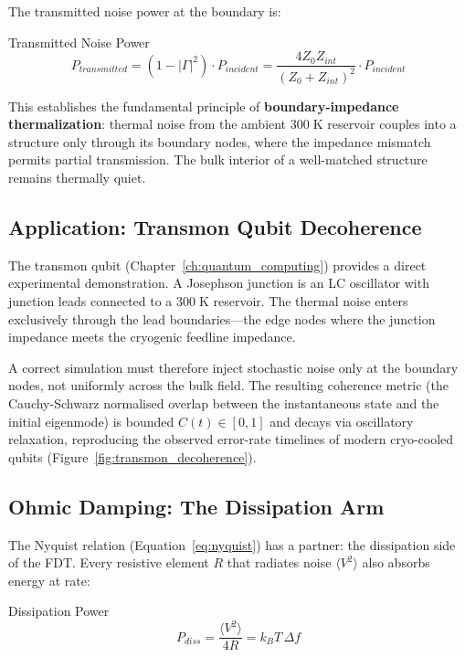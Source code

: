 The transmitted noise power at the boundary is:
\begin{resultbox}{Transmitted Noise Power}
\begin{equation}
    P_{transmitted} = (1 - |\Gamma|^2) \cdot P_{incident} = \frac{4 Z_0 Z_{int}}{(Z_0 + Z_{int})^2} \cdot P_{incident}
    \label{eq:transmitted_power}
\end{equation}
\end{resultbox}

This establishes the fundamental principle of \textbf{boundary-impedance thermalization}: thermal noise from the ambient $300\;\text{K}$ reservoir couples into a structure only through its boundary nodes, where the impedance mismatch permits partial transmission. The bulk interior of a well-matched structure remains thermally quiet.

\subsection{Application: Transmon Qubit Decoherence}

The transmon qubit (Chapter~\ref{ch:quantum_computing}) provides a direct experimental demonstration. A Josephson junction is an LC oscillator with junction leads connected to a $300\;\text{K}$ reservoir. The thermal noise enters exclusively through the lead boundaries---the edge nodes where the junction impedance meets the cryogenic feedline impedance.

A correct simulation must therefore inject stochastic noise only at the boundary nodes, not uniformly across the bulk field. The resulting coherence metric (the Cauchy-Schwarz normalised overlap between the instantaneous state and the initial eigenmode) is bounded $C(t) \in [0, 1]$ and decays via oscillatory relaxation, reproducing the observed error-rate timelines of modern cryo-cooled qubits (Figure~\ref{fig:transmon_decoherence}).

\subsection{Ohmic Damping: The Dissipation Arm}

The Nyquist relation (Equation~\ref{eq:nyquist}) has a partner: the dissipation side of the FDT. Every resistive element $R$ that radiates noise $\langle V^2 \rangle$ also absorbs energy at rate:
\begin{resultbox}{Dissipation Power}
\begin{equation}
    P_{diss} = \frac{\langle V^2 \rangle}{4R} = k_B T \, \Delta f
    \label{eq:dissipation}
\end{equation}
\end{resultbox}

